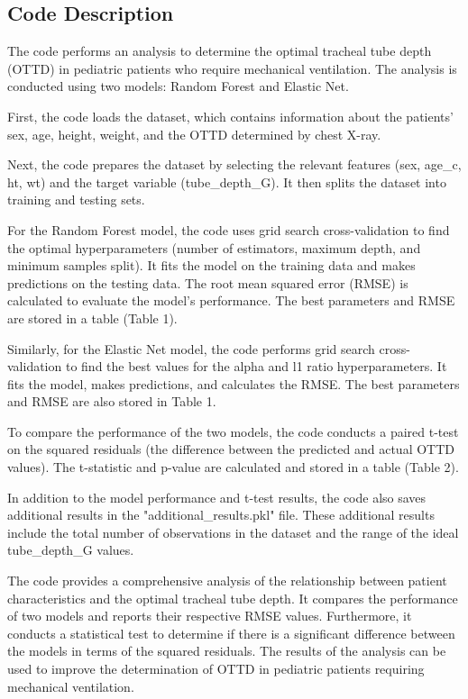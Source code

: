\documentclass[11pt]{article}
\begin{document}
\subsection{Code Description}

The code performs an analysis to determine the optimal tracheal tube depth (OTTD) in pediatric patients who require mechanical ventilation. The analysis is conducted using two models: Random Forest and Elastic Net.

First, the code loads the dataset, which contains information about the patients' sex, age, height, weight, and the OTTD determined by chest X-ray. 

Next, the code prepares the dataset by selecting the relevant features (sex, age\_c, ht, wt) and the target variable (tube\_depth\_G). It then splits the dataset into training and testing sets.

For the Random Forest model, the code uses grid search cross-validation to find the optimal hyperparameters (number of estimators, maximum depth, and minimum samples split). It fits the model on the training data and makes predictions on the testing data. The root mean squared error (RMSE) is calculated to evaluate the model's performance. The best parameters and RMSE are stored in a table (Table 1).

Similarly, for the Elastic Net model, the code performs grid search cross-validation to find the best values for the alpha and l1 ratio hyperparameters. It fits the model, makes predictions, and calculates the RMSE. The best parameters and RMSE are also stored in Table 1.

To compare the performance of the two models, the code conducts a paired t-test on the squared residuals (the difference between the predicted and actual OTTD values). The t-statistic and p-value are calculated and stored in a table (Table 2).

In addition to the model performance and t-test results, the code also saves additional results in the "additional\_results.pkl" file. These additional results include the total number of observations in the dataset and the range of the ideal tube\_depth\_G values.

The code provides a comprehensive analysis of the relationship between patient characteristics and the optimal tracheal tube depth. It compares the performance of two models and reports their respective RMSE values. Furthermore, it conducts a statistical test to determine if there is a significant difference between the models in terms of the squared residuals. The results of the analysis can be used to improve the determination of OTTD in pediatric patients requiring mechanical ventilation.
\end{document}
